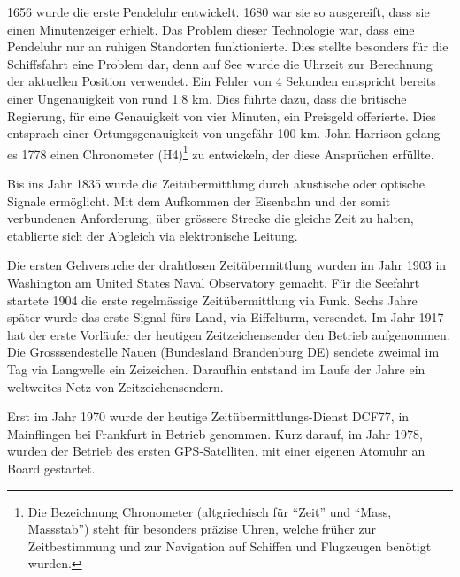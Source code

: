 1656 wurde die erste Pendeluhr entwickelt. 1680 war sie so ausgereift, dass sie einen Minutenzeiger erhielt. Das Problem dieser Technologie war, dass eine Pendeluhr nur an ruhigen Standorten funktionierte.
Dies stellte besonders für die Schiffsfahrt eine Problem dar, denn auf See wurde die Uhrzeit zur Berechnung der aktuellen Position verwendet.
Ein Fehler von 4 Sekunden entspricht bereits einer Ungenauigkeit  von rund 1.8 km.
Dies führte dazu, dass die britische Regierung, für eine Genauigkeit von vier Minuten, ein Preisgeld offerierte. Dies entsprach einer Ortungsgenauigkeit von ungefähr 100 km.
John Harrison gelang es 1778 einen Chronometer (H4)\footnote{Die Bezeichnung Chronometer (altgriechisch für "`Zeit"' und "`Mass, Massstab"') steht für besonders präzise Uhren, welche früher zur Zeitbestimmung und zur Navigation auf Schiffen und Flugzeugen benötigt wurden.} zu entwickeln, der diese Ansprüchen erfüllte.

Bis ins Jahr 1835 wurde die Zeitübermittlung durch akustische oder optische Signale ermöglicht.
Mit dem Aufkommen der Eisenbahn und der somit verbundenen Anforderung, über grössere Strecke die gleiche Zeit zu halten, etablierte sich der Abgleich via elektronische Leitung.

Die ersten Gehversuche der drahtlosen Zeitübermittlung wurden im Jahr 1903 in Washington am United States Naval Observatory gemacht.
Für die Seefahrt startete 1904 die erste regelmässige Zeitübermittlung via Funk. Sechs Jahre später wurde das erste Signal fürs Land, via Eiffelturm, versendet. Im Jahr 1917 hat der erste Vorläufer der heutigen Zeitzeichensender den Betrieb aufgenommen. Die Grosssendestelle Nauen (Bundesland Brandenburg DE) sendete zweimal im Tag via Langwelle ein Zeizeichen. Daraufhin entstand im Laufe der Jahre ein weltweites Netz von Zeitzeichensendern.

Erst im Jahr 1970 wurde der heutige Zeitübermittlungs-Dienst DCF77, in Mainflingen bei Frankfurt in Betrieb genommen.
Kurz darauf, im Jahr 1978, wurden der Betrieb des ersten GPS-Satelliten, mit einer eigenen Atomuhr an Board gestartet.


